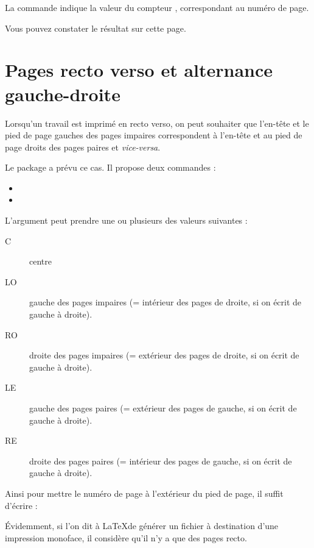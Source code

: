La commande  indique la valeur du compteur , correspondant au numéro de page.

Vous pouvez constater le résultat sur cette page.\thispagestyle{fancy}\cfoot{{\thepage} / \ref{TotPages}} \renewcommand{\headrulewidth}{0pt}
\fancyhead[LE,RO]{}
\fancyhead[RE]{\leftmark}
\fancyhead[LO]{\rightmark}

\section{Pages recto verso et alternance gauche-droite}

Lorsqu'un travail est imprimé en recto verso, on peut souhaiter que l'en-tête et le pied de page gauches des pages impaires correspondent à l'en-tête et au pied de page droits des pages paires et \emph{vice-versa}.

Le package  a prévu ce cas. Il propose deux commandes : 
\begin{itemize}
\item {}
\item {}
\end{itemize}

L'argument  peut prendre une ou plusieurs des valeurs suivantes :
\begin{description}
\item[C] centre
\item[LO] gauche des pages impaires (= intérieur des pages de droite, si on écrit de gauche à droite).
\item[RO] droite des pages impaires (= extérieur des pages de droite, si on écrit de gauche à droite).
\item[LE] gauche des pages paires (= extérieur des pages  de gauche, si on écrit de gauche à droite).
\item[RE] droite des pages paires (= intérieur des pages de gauche, si on écrit de gauche à droite).
\end{description}

Ainsi pour mettre le numéro de page à l'extérieur du pied de page, il suffit d'écrire :

\begin{latexcode}
\fancyfoot[LE,RO]{\thepage}
\end{latexcode}

Évidemment, si l'on dit à \LaTeX de générer un fichier à destination d'une impression monoface, il considère qu'il n'y a que des pages recto.

